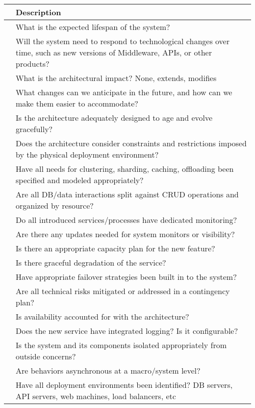 \documentclass{article}
\begin{document}
\begin{center}
    \begin{tabular}{ | p{.25cm} || p{10cm} |}
    \hline
     & Description \\ \hline
     & What is the expected lifespan of the system? \\ \hline
     & Will the system need to respond to technological changes over time, such as new versions of Middleware, APIs, or other products? \\ \hline
     & What is the architectural impact? None, extends, modifies \\ \hline
     & What changes can we anticipate in the future, and how can we make them easier to accommodate? \\ \hline
     & Is the architecture adequately designed to age and evolve gracefully? \\ \hline
     & Does the architecture consider constraints and restrictions imposed by the physical deployment environment? \\ \hline
     & Have all needs for clustering, sharding, caching, offloading been specified and modeled appropriately? \\ \hline
     & Are all DB/data interactions split against CRUD operations and organized by resource? \\ \hline
     & Do all introduced services/processes have dedicated monitoring? \\ \hline
     & Are there any updates needed for system monitors or visibility? \\ \hline
     & Is there an appropriate capacity plan for the new feature? \\ \hline
     & Is there graceful degradation of the service? \\ \hline
     & Have appropriate failover strategies been built in to the system? \\ \hline
     & Are all technical risks mitigated or addressed in a contingency plan? \\ \hline
     & Is availability accounted for with the architecture? \\ \hline
     & Does the new service have integrated logging?  Is it configurable? \\ \hline
     & Is the system and its components isolated appropriately from outside concerns? \\ \hline
     & Are behaviors asynchronous at a macro/system level? \\ \hline
     & Have all deployment environments been identified? DB servers, API servers, web machines, load balancers, etc \\ \hline

\end{tabular}
\end{center}
\end{document}
